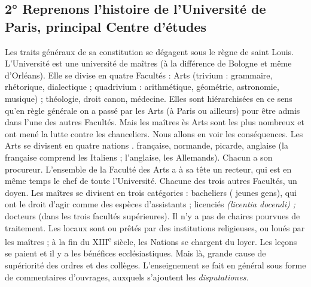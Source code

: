 \documentclass[french,twoside]{book} %
\begin{document}
\subsection[2° Reprenons l’histoire de l’Université de Paris, principal Centre d’études]{2° Reprenons l’histoire de l’Université de Paris, principal Centre d’études}
\noindent Les traits généraux de sa constitution se dégagent sous le règne de saint Louis. L’Université est une université de maîtres (à la différence de Bologne et même d’Orléans). Elle se divise en quatre Facultés : Arts (trivium : grammaire, rhétorique, dialectique ; quadrivium : arithmétique, géométrie, astronomie, musique) ; théologie, droit canon, médecine. Elles sont hiérarchisées en ce sens qu’en règle générale on a passé par les Arts (à Paris ou ailleurs) pour être admis dans l’une des autres Facultés. Mais les maîtres ès Arts sont les plus nombreux et ont mené la lutte contre les chanceliers. Nous allons en voir les conséquences. Les Arts se divisent en quatre nations . française, normande, picarde, anglaise (la française comprend les Italiens ; l’anglaise, les Allemands). Chacun a son procureur. L’ensemble de la Faculté des Arts a à sa tête un recteur, qui est en même temps le chef de toute l’Université. Chacune des trois autres Facultés, un doyen. Les maîtres se divisent en trois catégories : bacheliers ( jeunes gens), qui ont le droit d’agir comme des espèces d’assistants ; licenciés {\itshape (licentia docendi) ;} docteurs (dans les trois facultés supérieures). Il n’y a pas de chaires pourvues de traitement. Les locaux sont ou prêtés par des institutions religieuses, ou loués par les maîtres ; à la fin du XIII\textsuperscript{e} siècle, les Nations se chargent du loyer. Les leçons se paient et il y a les bénéfices ecclésiastiques. Mais là, grande cause de supériorité des ordres et des collèges. L’enseignement se fait en général sous forme de commentaires d’ouvrages, auxquels s’ajoutent les {\itshape disputationes.}\par
\end{document}
